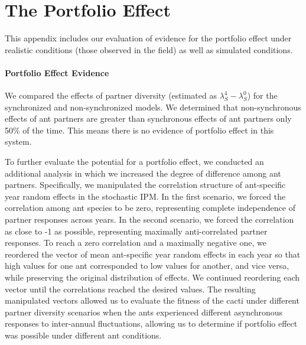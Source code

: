 \documentclass[11pt]{article}
\begin{document}
	\begin{figure}
		\caption{}
		\label{app:EqualLambdaMeans}
	\end{figure}
	
	
	\section{The Portfolio Effect} 
	\label{appendix:D}
	\renewcommand{\thefigure}{D\arabic{figure}}
	
	This appendix includes our evaluation of evidence for the portfolio effect under realistic conditions (those observed in the field) as well as simulated conditions.
	
	\paragraph{Portfolio Effect Evidence}
	We compared the effects of partner diversity (estimated as $\lambda_S^4 - \lambda_S^0$) for the synchronized and non-synchronized models.
	We determined that non-synchronous effects of ant partners are greater than synchronous effects of ant partners only 50\% of the time.
	This means there is no evidence of portfolio effect in this system.
	
	
	\begin{figure}[H]
		\caption{}
		\label{fig:Portfolio}
	\end{figure}
	
	
	To further evaluate the potential for a portfolio effect, we conducted an additional analysis in which we increased the degree of difference among ant partners. 
	Specifically, we manipulated the correlation structure of ant-specific year random effects in the stochastic IPM. 
	In the first scenario, we forced the correlation among ant species to be zero, representing complete independence of partner responses across years. 
	In the second scenario, we forced the correlation as close to -1 as possible, representing maximally anti-correlated partner responses.
	To reach a zero correlation and a maximally negative one, we reordered the vector of mean ant-specific year random effects in each year so that high values for one ant corresponded to low values for another, and vice versa, while preserving the original distribution of effects. 
	We continued reordering each vector until the correlations reached the desired values. 
	The resulting manipulated vectors allowed us to evaluate the fitness of the cacti under different partner diversity scenarios when the ants experienced different asynchronous responses to inter-annual fluctuations, allowing us to determine if portfolio effect was possible under different ant conditions.
	
\end{document}
